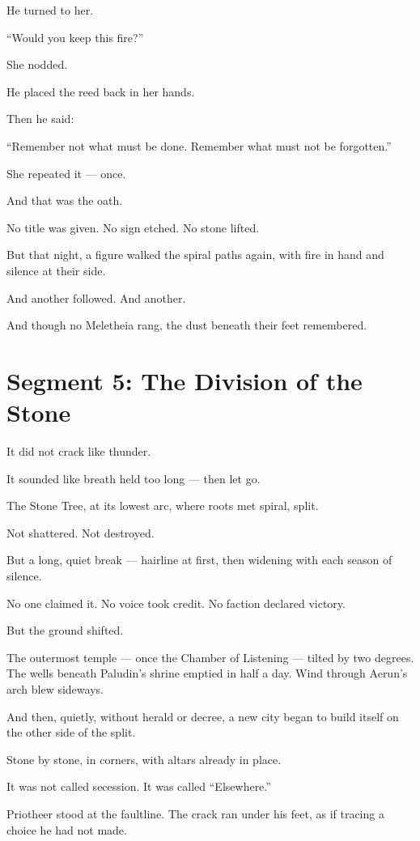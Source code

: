 \documentclass[10pt]{article}
\begin{document}
He turned to her.

 “Would you keep this fire?”

She nodded.

He placed the reed back in her hands.

Then he said:

 “Remember not what must be done.  
 Remember what must not be forgotten.”

She repeated it — once.

And that was the oath.

No title was given.  
No sign etched.  
No stone lifted.

But that night, a figure walked the spiral paths again,  
with fire in hand  
and silence at their side.

And another followed.  
And another.

And though no Meletheia rang,  
the dust beneath their feet remembered.

\newpage

\section*{Segment 5: The Division of the Stone}


It did not crack like thunder.

It sounded like breath held too long —  
then let go.

The Stone Tree, at its lowest arc,  
where roots met spiral,  
split.

Not shattered. Not destroyed.

But a long, quiet break —  
hairline at first,  
then widening with each season of silence.

No one claimed it.  
No voice took credit.  
No faction declared victory.

But the ground shifted.

The outermost temple — once the Chamber of Listening — tilted by two degrees.  
The wells beneath Paludin’s shrine emptied in half a day.  
Wind through Aerun’s arch blew sideways.

And then, quietly, without herald or decree,  
a new city began to build itself on the other side of the split.

Stone by stone,  
in corners,  
with altars already in place.

It was not called secession.  
It was called “Elsewhere.”

Priotheer stood at the faultline.  
The crack ran under his feet,  
as if tracing a choice he had not made.
\end{document}
